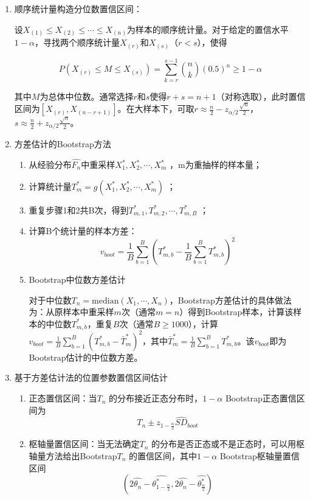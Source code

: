 \documentclass[
]{book}
\begin{document}
\begin{enumerate}
\def\labelenumi{\arabic{enumi}.}
\item
  顺序统计量构造分位数置信区间：

  设\(X_{(1)} \leq X_{(2)} \leq \cdots \leq X_{(n)}\)为样本的顺序统计量。对于给定的置信水平\(1-\alpha\)，寻找两个顺序统计量\(X_{(r)}\)和\(X_{(s)}\)（\(r < s\)），使得

  \[P(X_{(r)} \leq M \leq X_{(s)}) = \sum_{k=r}^{s-1} \binom{n}{k} (0.5)^n \geq 1-\alpha\]

  其中\(M\)为总体中位数。通常选择\(r\)和\(s\)使得\(r + s = n + 1\)（对称选取），此时置信区间为\([X_{(r)}, X_{(n-r+1)}]\)。在大样本下，可取\(r \approx \frac{n}{2} - z_{\alpha/2}\frac{\sqrt{n}}{2}\)，\(s \approx \frac{n}{2} + z_{\alpha/2}\frac{\sqrt{n}}{2}\)。
\item
  方差估计的Bootstrap方法

  \begin{enumerate}
  \def\labelenumii{\arabic{enumii}.}
  \item
    从经验分布\(\hat{F_n}\)中重采样\(X_1^*,X_2^*,\cdots,X_m^*\) ，m为重抽样的样本量；
  \item
    计算统计量\(T^*_m=g(X_1^*,X_2^*,\cdots,X_m^*)\) ；
  \item
    重复步骤1和2共B次，得到\(T^*_{m,1},T^*_{m,2},\cdots,T^*_{m,B}\) ；
  \item
    计算B个统计量的样本方差：\[
    v_{boot}=\frac{1}{B}\sum_{b=1}^B(T^*_{m,b}-\frac{1}{B}\sum_{b=1}^BT^*_{m,b})^2
    \]
  \item
    Bootstrap中位数方差估计

    对于中位数\(T_n = \text{median}(X_1, \cdots, X_n)\)，Bootstrap方差估计的具体做法为：从原样本中重采样\(m\)次（通常\(m = n\)）得到Bootstrap样本，计算该样本的中位数\(T^*_{m,b}\)，重复\(B\)次（通常\(B \geq 1000\)），计算\(v_{boot} = \frac{1}{B}\sum_{b=1}^B (T^*_{m,b} - \bar{T}^*_m)^2\)，其中\(\bar{T}^*_m = \frac{1}{B}\sum_{b=1}^B T^*_{m,b}\)。该\(v_{boot}\)即为Bootstrap估计的中位数方差。
  \end{enumerate}
\item
  基于方差估计法的位置参数置信区间估计

  \begin{enumerate}
  \def\labelenumii{\arabic{enumii}.}
  \item
    正态置信区间：当\(T_n\) 的分布接近正态分布时，\(1-\alpha\) Bootstrap正态置信区间为\[
    T_n\pm z_{1-\frac{\alpha}{2}}\hat{SD}_{boot}
    \]
  \item
    枢轴量置信区间：当无法确定\(T_n\) 的分布是否正态或不是正态时，可以用枢轴量方法给出Bootstrap\(T_n\) 的置信区间，其中\(1-\alpha\) Bootstrap枢轴量置信区间\[
    (2\hat{\theta_n}-\hat{\theta^*_{1-\frac{\alpha}{2}}},2\hat{\theta_n}-\hat{\theta^*_{\frac{\alpha}{2}}})
    \]


\end{enumerate}
\end{enumerate}
\end{document}
